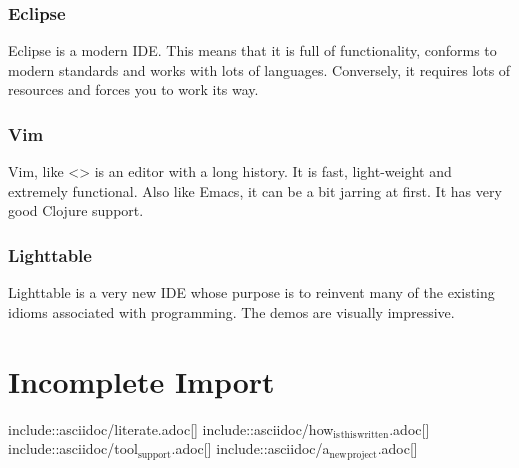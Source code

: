 \documentclass[11pt]{article}
\begin{document}
\subsubsection{Eclipse}
\label{sec-6-1-2}

Eclipse is a modern IDE. This means that it is full of functionality,
conforms to modern standards and works with lots of languages.
Conversely, it requires lots of resources and forces you to work its
way.

\subsubsection{Vim}
\label{sec-6-1-3}

Vim, like <> is an editor with a long history. It is fast, light-weight
and extremely functional. Also like Emacs, it can be a bit jarring at
first. It has very good Clojure support.

\subsubsection{Lighttable}
\label{sec-6-1-4}

Lighttable is a very new IDE whose purpose is to reinvent many of the
existing idioms associated with programming. The demos are visually
impressive.



\section{Incomplete Import}
\label{sec-7}




include::asciidoc/literate.adoc[]
include::asciidoc/how$_{\text{is}}$$_{\text{this}}$$_{\text{written}}$.adoc[]
include::asciidoc/tool$_{\text{support}}$.adoc[]
include::asciidoc/a$_{\text{new}}$$_{\text{project}}$.adoc[]
\end{document}
